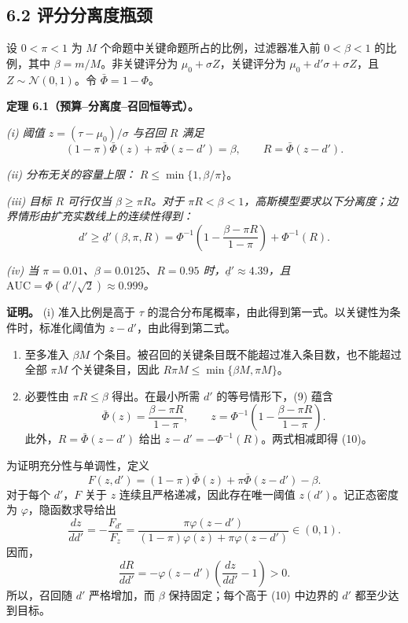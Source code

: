 \documentclass[
  chinese,
  11pt]{article}
\begin{document}
\subsection{6.2 评分分离度瓶颈}\label{ux8bc4ux5206ux5206ux79bbux5ea6ux74f6ux9888}

设 \(0<\pi<1\) 为 \(M\) 个命题中关键命题所占的比例，过滤器准入前 \(0<\beta<1\) 的比例，其中 \(\beta=m/M\)。非关键评分为 \(\mu_0+\sigma Z\)，关键评分为 \(\mu_0+d'\sigma+\sigma Z\)，且 \(Z\sim\mathcal N(0,1)\)。令 \(\bar\Phi=1-\Phi\)。

\textbf{定理 6.1（预算--分离度--召回恒等式）。}

\emph{(i) 阈值 \(z=(\tau-\mu_0)/\sigma\) 与召回 \(R\) 满足} \[
(1-\pi)\bar\Phi(z)+\pi\bar\Phi(z-d')=\beta,
\qquad R=\bar\Phi(z-d').
\tag{9}
\]

\emph{(ii) 分布无关的容量上限：} \(R\leq\min\{1,\beta/\pi\}\)。

\emph{(iii) 目标 \(R\) 可行仅当 \(\beta\geq\pi R\)。对于 \(\pi R<\beta<1\)，高斯模型要求以下分离度；边界情形由扩充实数线上的连续性得到：} \[
d'\geq\underline d'(\beta,\pi,R)=
\Phi^{-1}\!\left(1-\frac{\beta-\pi R}{1-\pi}\right)+\Phi^{-1}(R).
\tag{10}
\]

\emph{(iv) 当 \(\pi=0.01\)、\(\beta=0.0125\)、\(R=0.95\) 时，\(\underline d'\approx4.39\)，且 \(\mathrm{AUC}=\Phi(d'/\sqrt2)\approx0.999\)。}

\textbf{证明。} (i) 准入比例是高于 \(\tau\) 的混合分布尾概率，由此得到第一式。以关键性为条件时，标准化阈值为 \(z-d'\)，由此得到第二式。

\begin{enumerate}
\def\labelenumi{(\roman{enumi})}
\setcounter{enumi}{1}
\item
  至多准入 \(\beta M\) 个条目。被召回的关键条目既不能超过准入条目数，也不能超过全部 \(\pi M\) 个关键条目，因此 \(R\pi M\leq\min\{\beta M,\pi M\}\)。
\item
  必要性由 \(\pi R\leq\beta\) 得出。在最小所需 \(d'\) 的等号情形下，(9) 蕴含 \[
  \bar\Phi(z)=\frac{\beta-\pi R}{1-\pi},
  \qquad
  z=\Phi^{-1}\!\left(1-\frac{\beta-\pi R}{1-\pi}\right).
  \] 此外，\(R=\bar\Phi(z-d')\) 给出 \(z-d'=-\Phi^{-1}(R)\)。两式相减即得 (10)。
\end{enumerate}

为证明充分性与单调性，定义 \[
F(z,d')=(1-\pi)\bar\Phi(z)+\pi\bar\Phi(z-d')-\beta.
\] 对于每个 \(d'\)，\(F\) 关于 \(z\) 连续且严格递减，因此存在唯一阈值 \(z(d')\)。记正态密度为 \(\varphi\)，隐函数求导给出 \[
\frac{dz}{dd'}=-\frac{F_{d'}}{F_z}
=\frac{\pi\varphi(z-d')}{(1-\pi)\varphi(z)+\pi\varphi(z-d')}\in(0,1).
\] 因而， \[
\frac{dR}{dd'}=-\varphi(z-d')\left(\frac{dz}{dd'}-1\right)>0.
\] 所以，召回随 \(d'\) 严格增加，而 \(\beta\) 保持固定；每个高于 (10) 中边界的 \(d'\) 都至少达到目标。
\end{document}
